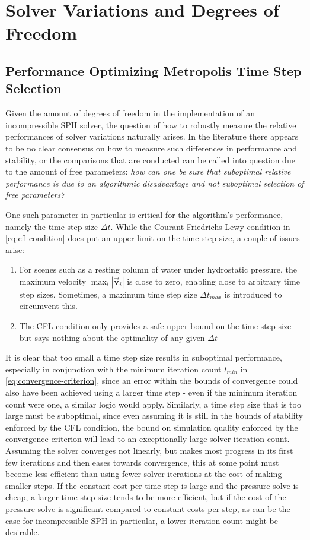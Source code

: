 \documentclass[oneside, a4paper]{book}
\newcommand\abs[1]{\left|#1\right|}
\newcommand\vek[1]{\vec{\bm{#1}}}
\begin{document}
    \section{Solver Variations and Degrees of Freedom}\label{sec:alternative-source-terms}
    \subsection{Performance Optimizing Metropolis Time Step Selection}
    Given the amount of degrees of freedom in the implementation of an incompressible SPH solver, the question of how to robustly measure the relative performances of solver variations naturally arises. In the literature there appears to be no clear consensus on how to measure such differences in performance and stability, or the comparisons that are conducted can be called into question due to the amount of free parameters: \textit{how can one be sure that suboptimal relative performance is due to an algorithmic disadvantage and not suboptimal selection of free parameters?}

    One such parameter in particular is critical for the algorithm's performance, namely the time step size $\Delta t$. While the Courant-Friedrichs-Lewy condition in \autoref{eq:cfl-condition} does put an upper limit on the time step size, a couple of issues arise:
    \begin{enumerate}
      \item For scenes such as a resting column of water under hydrostatic pressure, the maximum velocity $\max_i\abs{\vek{v}_i}$ is close to zero, enabling close to arbitrary time step sizes. Sometimes, a maximum time step size $\Delta t_{max}$ is introduced to circumvent this.
      \item The CFL condition only provides a safe upper bound on the time step size but says nothing about the optimality of any given $\Delta t$
    \end{enumerate}

    It is clear that too small a time step size results in suboptimal performance, especially in conjunction with the minimum iteration count $l_{min}$ in \autoref{eq:convergence-criterion}, since an error within the bounds of convergence could also have been achieved using a larger time step - even if the minimum iteration count were one, a similar logic would apply. Similarly, a time step size that is too large must be suboptimal, since even assuming it is still in the bounds of stability enforced by the CFL condition, the bound on simulation quality enforced by the convergence criterion will lead to an exceptionally large solver iteration count. Assuming the solver converges not linearly, but makes most progress in its first few iterations and then eases towards convergence, this at some point must become less efficient than using fewer solver iterations at the cost of making smaller steps. If the constant cost per time step is large and the pressure solve is cheap, a larger time step size tends to be more efficient, but if the cost of the pressure solve is significant compared to constant costs per step, as can be the case for incompressible SPH in particular, a lower iteration count might be desirable.
\end{document}
